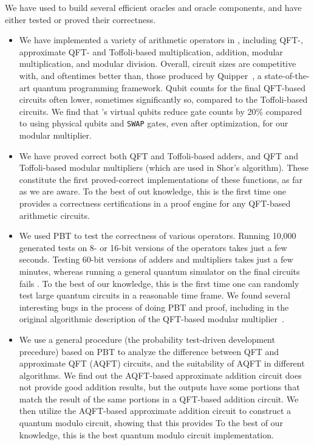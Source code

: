 We have used \name to build several efficient oracles and oracle
components, and have either tested or proved their correctness.
\begin{itemize}
\item We have implemented a variety of arithmetic operators in \oqasm,
including QFT-, approximate QFT- and Toffoli-based multiplication, addition, modular
multiplication, and modular division. Overall,
circuit sizes are competitive with, and oftentimes better than, those
produced by Quipper~\cite{Green2013}, a state-of-the-art 
quantum programming framework.  Qubit
counts for the final QFT-based circuits often lower, sometimes
significantly so, compared to the Toffoli-based circuits. 
 We find
that \oqasm's virtual qubits reduce gate counts by 20\% compared to
using physical qubits and \texttt{SWAP} gates, even after \voqc optimization,
for our modular multiplier. 

\item We have proved correct both QFT and Toffoli-based adders, and QFT
and Toffoli-based modular multipliers (which are used in Shor's
algorithm). These constitute the first proved-correct implementations
of these functions, as far as we are aware.
To the best of out knowledge, this is the first time one provides a correctness certifications in a proof engine for any QFT-based arithmetic circuits.

\item We used PBT to test the correctness of various \oqasm operators.
Running 10,000 generated tests on 8- or 16-bit versions
of the operators takes just a few seconds. Testing 60-bit versions of
adders and multipliers takes just a few minutes, whereas running a general
quantum simulator on the final circuits fails  .
To the best of our knowledge, this is the first time one can randomly test large quantum circuits in a reasonable time frame.
 We found several interesting bugs in the process
of doing PBT and proof, including in the original algorithmic
description of the QFT-based modular multiplier~\cite{qft-adder}.  

\item We use a general procedure (the probability test-driven development precedure) based on PBT to analyze the difference between QFT and approximate QFT (AQFT) circuits, and the suitability of AQFT in different algorithms.
We find out the AQFT-based approximate addition circuit does not provide good addition results, but the outputs have some portions that match the result of the same portions in a QFT-based addition circuit. 
We then utilize the AQFT-based approximate addition circuit to construct a
quantum modulo circuit, showing that this provides 
To the best of our knowledge, this is the best quantum modulo circuit implementation.


\end{itemize}
